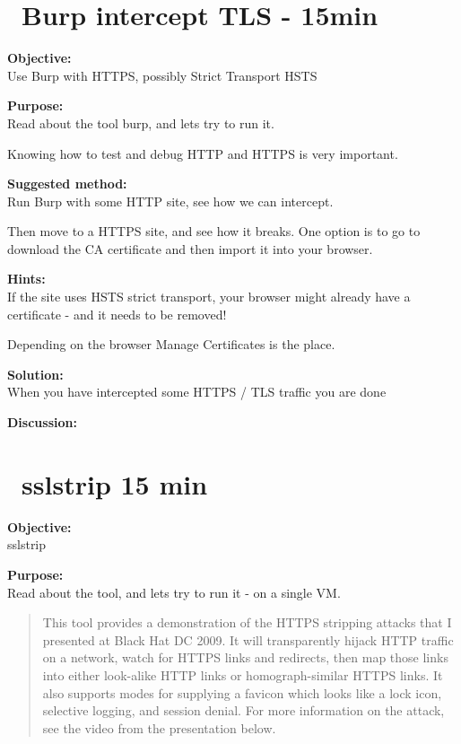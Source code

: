 \documentclass[a4paper,11pt,notitlepage]{report}
\begin{document}
\chapter{\faInfoCircle\ Burp intercept TLS - 15min}
\label{ex:burp-tls}

{\bf Objective:}\\
Use Burp with HTTPS, possibly Strict Transport HSTS

{\bf Purpose:}\\
Read about the tool burp, and lets try to run it.

Knowing how to test and debug HTTP and HTTPS is very important.

{\bf Suggested method:}\\
Run Burp with some HTTP site, see how we can intercept.

Then move to a HTTPS site, and see how it breaks. One option is to go to  download the CA certificate and then import it into your browser.


{\bf Hints:}\\
If the site uses HSTS strict transport, your browser might already have a certificate - and it needs to be removed!

Depending on the browser Manage Certificates is the place.

{\bf Solution:}\\
When you have intercepted some HTTPS / TLS traffic you are done

{\bf Discussion:}\\







\chapter{\faInfoCircle\ sslstrip 15 min}
\label{ex:sslstrip}

{\bf Objective:}\\
sslstrip 

{\bf Purpose:}\\
Read about the tool, and lets try to run it - on a single VM.

\begin{quote}
This tool provides a demonstration of the HTTPS stripping attacks that I presented at Black Hat DC 2009. It will transparently hijack HTTP traffic on a network, watch for HTTPS links and redirects, then map those links into either look-alike HTTP links or homograph-similar HTTPS links. It also supports modes for supplying a favicon which looks like a lock icon, selective logging, and session denial. For more information on the attack, see the video from the presentation below.
\end{quote}
\end{document}
